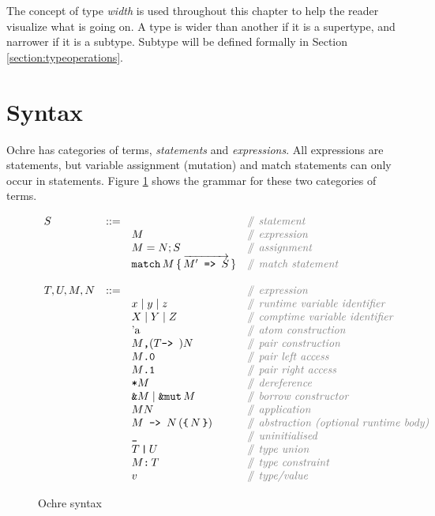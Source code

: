 \documentclass[12pt,twoside]{report}
\begin{document}
The concept of type \textit{width} is used throughout this chapter to help the reader visualize what is going on. A type is wider than another if it is a supertype, and narrower if it is a subtype. Subtype will be defined formally in Section \ref{section:typeoperations}.

\section{Syntax}
\label{section:syntax}
Ochre has categories of terms, \textit{statements} and \textit{expressions}. All expressions are statements, but variable assignment (mutation) and match statements can only occur in statements. Figure \ref{fig:syntax} shows the grammar for these two categories of terms.

\begin{figure}
  \arraycolsep=1pt %
  \centering

  \vspace{-2ex} %
  \[
  \begin{array}[t]{llll}
    S & ::= & & \ocomment{statement} \\
    & & M & \ocomment{expression} \\
    & & M = N; S & \ocomment{assignment} \\
    & & \mono{match}\,M\,\{\,\overrightarrow{M'\mono{ => }S}\,\} & \ocomment{match statement} \\
    \\
    T, U, M, N & ::= & & \ocomment{expression} \\
    && x \mid{} y \mid{} z  & \ocomment{runtime variable identifier} \\
    && X \mid{} Y \mid{} Z  & \ocomment{comptime variable identifier} \\
    && \atom{a} & \ocomment{atom construction} \\
    && M\mono{,} (T \mono{-> }) N & \ocomment{pair construction} \\
    && \pleft{M} & \ocomment{pair left access} \\
    && \pright{M} & \ocomment{pair right access} \\
    && \deref{M} & \ocomment{dereference} \\
    && \mono{\&}M \mid \mono{\&mut}\,M & \ocomment{borrow constructor} \\
    && M N & \ocomment{application} \\
    && \mono{$M$ -> $N$} \,(\mono{\{}\,N\,\mono{\}}) & \ocomment{abstraction (optional runtime body)} \\
    && \mono{\_} & \ocomment{uninitialised} \\
    && T\,\mono{|}\,U & \ocomment{type union} \\
    && M\mono{:}\,T & \ocomment{type constraint} \\
    && v & \ocomment{type/value} \\
  \end{array} %
  \]
\caption{Ochre syntax} %
\label{fig:syntax} %
\end{figure} %
\end{document}
